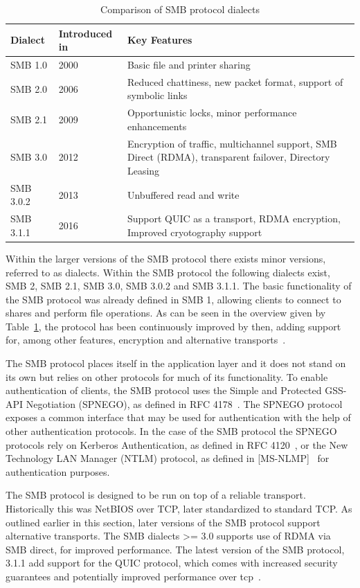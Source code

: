 \documentclass[english, 12pt, a4paper, elec, utf8, a-2b, online]{aaltothesis}
\begin{document}
\begin{table}[h]
\centering
\caption{Comparison of SMB protocol dialects}
\label{tab:smb_dialects}
\begin{tabular}{|l|p{5cm}|p{5cm}|}
\hline
\textbf{Dialect} & \textbf{Introduced in} & \textbf{Key Features}\\ \hline
SMB 1.0 & 2000 & Basic file and printer sharing \\ \hline
SMB 2.0 & 2006 & Reduced chattiness, new packet format, support of symbolic links \\ \hline
SMB 2.1 & 2009 & Opportunistic locks, minor performance enhancements \\ \hline
SMB 3.0 & 2012 & Encryption of traffic, multichannel support, SMB Direct (RDMA), transparent failover, Directory Leasing \\ \hline
SMB 3.0.2 & 2013 & Unbuffered read and write \\ \hline
SMB 3.1.1 & 2016 & Support QUIC as a transport, RDMA encryption, Improved cryotography support \\ \hline
\end{tabular}
\end{table}

Within the larger versions of the SMB protocol there exists minor versions, referred
to as dialects. Within the SMB protocol the following dialects exist, SMB 2,
SMB 2.1, SMB 3.0, SMB 3.0.2 and SMB 3.1.1. The basic functionality of the SMB protocol
was already defined in SMB 1, allowing clients to connect to shares and perform file
operations. As can be seen in the overview given by Table~\ref{tab:smb_dialects},
the protocol has been continuously improved by then, adding support for, among other
features, encryption and alternative transports~\cite{smb2_tech}.

The SMB protocol places itself in the application layer and it does not stand on its
own but relies on other protocols for much of its functionality. To enable authentication
of clients, the SMB protocol uses the Simple and Protected GSS-API Negotiation (SPNEGO), as
defined in RFC 4178~\cite{rfc4178}. The SPNEGO protocol exposes a common interface
that may be used for authentication with the help of other authentication protocols.
In the case of the SMB protocol the SPNEGO protocols rely on Kerberos Authentication, as
defined in RFC 4120~\cite{rfc4120}, or the New Technology LAN Manager (NTLM) protocol,
as defined in {[MS-NLMP]}~\cite{ntlm_tech} for authentication purposes.

The SMB protocol is designed to be run on top of a reliable transport. Historically
this was NetBIOS over TCP, later standardized to standard TCP. As outlined earlier
in this section, later versions of the SMB protocol support alternative transports. The
SMB dialects >= 3.0 supports use of RDMA via SMB direct, for improved performance.
The latest version of the SMB protocol, 3.1.1 add support for the QUIC protocol,
which comes with increased security guarantees and potentially improved performance
over tcp~\cite{smb2_tech}.
\end{document}
